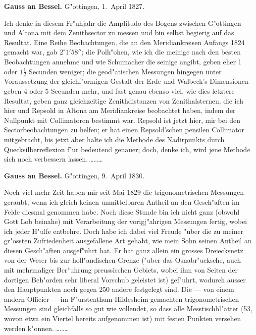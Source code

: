 \documentclass[12pt,a4paper]{article}
\theoremstyle{plain}
\theoremstyle{definition}
\theoremstyle{remark}
\begin{document}
\newpage
\noindent \textbf{Gauss an Bessel.} G"ottingen, 1.~April 1827.

\medskip
\noindent Ich denke in diesem Fr"uhjahr die Amplitudo des Bogens zwischen G"ottingen und Altona mit dem Zenithsector zu messen und bin selbst begierig auf das Resultat. Eine Reihe Beobachtungen, die an den Meridiankreisen Anfangs 1824 gemacht war, gab $2^{\circ}1'58''$; die Polh"ohen, wie ich die meinige nach den besten Beobachtungen annehme und wie Schumacher die seinige angibt, geben eher 1 oder $1\frac{1}{2}$ Secunden weniger; die geod"atischen Messungen hingegen unter Voraussetzung der gleichf"ormigen Gestalt der Erde und Walbeck's Dimensionen geben 4 oder 5 Secunden mehr, und fast genau ebenso viel, wie dies letztere Resultat, geben ganz gleichzeitige Zenithdistanzen von Zenithalsternen, die ich hier und Repsold in Altona am Meridiankreise beobachtet haben, indem der Nullpunkt mit Collimatoren bestimmt war. Repsold ist jetzt hier, mir bei den Sectorbeobachtungen zu helfen; er hat einen Repsold'schen pensilen Collimator mitgebracht, bis jetzt aber halte ich die Methode des Nadirpunkts durch Quecksilberreflexion f"ur bedeutend genauer; doch, denke ich, wird jene Methode sich noch verbessern lassen.\,\ldots\ldots\ldots

\medskip
\noindent \textbf{Gauss an Bessel.} G"ottingen, 9.~April 1830.

\medskip
\noindent Noch viel mehr Zeit haben mir seit Mai 1829 die trigonometrischen Messungen geraubt, wenn ich gleich keinen unmittelbaren Antheil an den Gesch"aften im Felde diesmal genommen habe. Noch diese Stunde bin ich nicht ganz (obwohl Gott Lob beinahe) mit Verarbeitung der vorigj"ahrigen Messungen fertig, wobei ich jeder H"ulfe entbehre. Doch habe ich dabei viel Freude "uber die zu meiner gr"ossten Zufriedenheit ausgefallene Art gehabt, wie mein Sohn seinen Antheil an diesen Gesch"aften ausgef"uhrt hat. Er hat ganz allein ein grosses Dreiecksnetz von der Weser bis zur holl"andischen Grenze ("uber das Osnabr"ucksche, auch mit mehrmaliger Ber"uhrung preussischen Gebiets, wobei ihm von Seiten der dortigen Beh"orden sehr liberal Vorschub geleistet ist) gef"uhrt, wodurch ausser den Hauptpunkten noch gegen 250 andere festgelegt sind. Die --- von einem andern Officier --- im F"urstenthum Hildesheim gemachten trigonometrischen Messungen sind gleichfalls so gut wie vollendet, so dass alle Messtischbl"atter (53, wovon etwa ein Viertel bereits aufgenommen ist) mit festen Punkten versehen werden k"onnen.\,\ldots\ldots\ldots

\newpage
\end{document}
